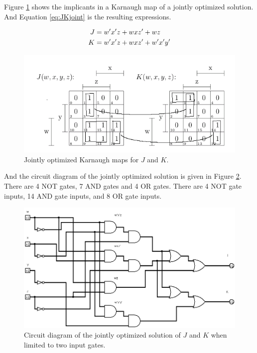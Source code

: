 \documentclass[12pt]{article}
\begin{document}
Figure \ref{fig:JKjointkmap} shows the implicants in a Karnaugh map
of a jointly optimized solution.
And Equation \ref{eq:JKjoint} is the resulting expressions.

\begin{align}
	J &= w'x'z + wxz' + wz  \notag \\
	K &= w'x'z + wxz' + w'x'y'  \label{eq:JKjoint}
\end{align}

\begin{figure}[!htb]
\center
\includegraphics[scale=0.60]{JKkmap-01}
\caption{Jointly optimized Karnaugh maps for $J$ and $K$.}
\label{fig:JKjointkmap}
\end{figure}

And the circuit diagram of the jointly optimized solution is given
in Figure \ref{fig:JKjointcircuit}.
There are 4 NOT gates, 7 AND gates and 4 OR gates.
There are 4 NOT gate inputs, 14 AND gate inputs, and 8 OR gate inputs.

\begin{figure}[!htb]
\center
\includegraphics[scale=0.5]{JKjoint-01}
\caption{Circuit diagram of the jointly optimized solution of $J$ and $K$ when limited to two input gates.}
\label{fig:JKjointcircuit}
\end{figure}
\end{document}
